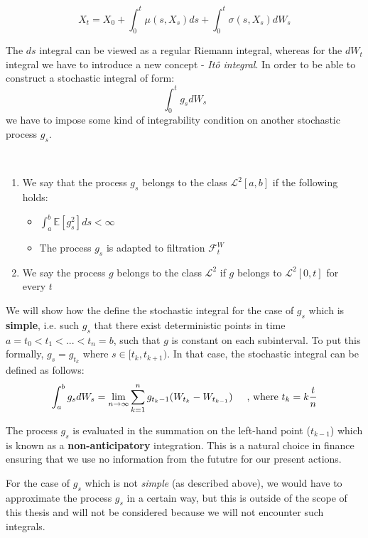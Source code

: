 \documentclass[times, utf8, diplomski]{fer}
\begin{document}
$$ X_t = X_0 + \int_0^t \mu(s,X_s)ds + \int_0^t \sigma(s,X_s)dW_s $$

\noindent The $ds$ integral can be viewed as a regular Riemann integral, whereas for the $dW_t$ integral we have to introduce a new concept - \textit{It\^{o} integral}.
In order to be able to construct a stochastic integral of form:
$$ \int_0^t g_sdW_s$$
\noindent we have to impose some kind of integrability condition on another stochastic process $g_s$.

\begin{definition}~\\
\begin{enumerate}
	\item We say that the process $g_s$ belongs to the class $\mathcal{L}^2[a,b]$ if the following holds:
	\begin{itemize}
		\item $ \int_a^b\mathbb{E}[g_s^2]ds < \infty $
		\item The process $g_s$ is adapted to filtration $\mathcal{F}_t^W$
	\end{itemize}
	\item We say the process $g$ belongs to the class $\mathcal{L}^2$ if $g$ belongs to $\mathcal{L}^2[0,t]$ for every $t$
\end{enumerate}
\end{definition}

\noindent We will show how the define the stochastic integral for the case of $g_s$ which is \textbf{simple}, i.e. such $g_s$ that there exist deterministic points in time $a=t_0 < t_1 < ... < t_n = b$, such that $g$ is constant on each subinterval. To put this formally, $g_s=g_{t_k}$ where $s \in [t_k,t_{k+1})$. In that case, the stochastic integral can be defined as follows:
$$ \int_a^bg_sdW_s = \lim_{n\rightarrow\infty} \sum_{k=1}^n g_{t_k-1}(W_{t_k} - W_{t_{k-1}}) \hspace{0.5cm} \text{, where } t_k = k\frac{t}{n}$$

\noindent The process $g_s$ is evaluated in the summation on the left-hand point ($t_{k-1}$) which is known as a \textbf{non-anticipatory} integration. This is a natural choice in finance ensuring that we use no information from the fututre for our present actions.

\noindent For the case of $g_s$ which is not \textit{simple} (as described above), we would have to approximate the process $g_s$ in a certain way, but this is outside of the scope of this thesis and will not be considered because we will not encounter such integrals.
\end{document}

